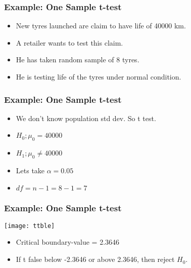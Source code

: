 \begin{frame}[fragile]\frametitle{Example: One Sample t-test}
\begin{itemize}
\item New tyres launched are claim to have life of 40000 km.
\item A retailer wants to test this claim.
\item He has taken random sample of 8 tyres.
\item He is testing life of the tyres under normal condition.
\end{itemize}
\end{frame}

\begin{frame}[fragile]\frametitle{Example: One Sample t-test}
\begin{itemize}
\item We don't know population std dev. So t test.
\item $H_0; \mu_0 = 40000$ 
\item $H_1; \mu_0 \ne 40000$ 
\item Lets take $\alpha = 0.05$
\item $df = n -1 = 8 - 1 = 7$
\end{itemize}
\end{frame}

\begin{frame}[fragile]\frametitle{Example: One Sample t-test}
\begin{center}
\texttt{[image: ttble]}
\end{center}
\begin{itemize}
\item Critical boundary-value = 2.3646
\item If t false below -2.3646 or above 2.3646, then reject $H_0$.
\end{itemize}
\end{frame}



